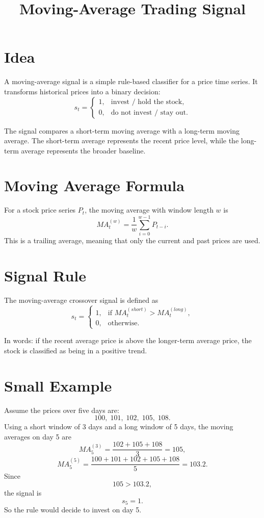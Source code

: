 \documentclass[11pt]{article}
\title{Moving-Average Trading Signal}
\author{}
\date{}
\begin{document}
\maketitle

\section*{Idea}
A moving-average signal is a simple rule-based classifier for a price time series. It transforms historical prices into a binary decision:
\[
    s_t =
    \begin{cases}
    1, & \text{invest / hold the stock},\\
    0, & \text{do not invest / stay out.}
    \end{cases}
\]

The signal compares a short-term moving average with a long-term moving average. The short-term average represents the recent price level, while the long-term average represents the broader baseline.

\section*{Moving Average Formula}
For a stock price series $P_t$, the moving average with window length $w$ is
\[
    MA_t^{(w)} = \frac{1}{w} \sum_{i=0}^{w-1} P_{t-i}.
\]
This is a trailing average, meaning that only the current and past prices are used.

\section*{Signal Rule}
The moving-average crossover signal is defined as
\[
    s_t =
    \begin{cases}
    1, & \text{if } MA_t^{(short)} > MA_t^{(long)},\\
    0, & \text{otherwise.}
    \end{cases}
\]

In words: if the recent average price is above the longer-term average price, the stock is classified as being in a positive trend.

\section*{Small Example}
Assume the prices over five days are:
\[
100,\; 101,\; 102,\; 105,\; 108.
\]
Using a short window of 3 days and a long window of 5 days, the moving averages on day 5 are
\[
    MA_5^{(3)} = \frac{102 + 105 + 108}{3} = 105,
\]
\[
    MA_5^{(5)} = \frac{100 + 101 + 102 + 105 + 108}{5} = 103.2.
\]
Since
\[
    105 > 103.2,
\]
the signal is
\[
    s_5 = 1.
\]
So the rule would decide to invest on day 5.
\end{document}
